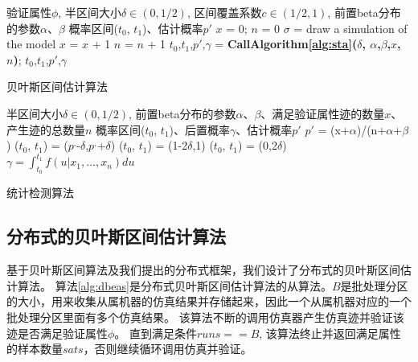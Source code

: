 \begin{algorithm}
\begin{algorithmic}[1]
\REQUIRE 验证属性$\phi$, 半区间大小$\delta \in (0, 1/2)$, 区间覆盖系数$c \in (1/2, 1)$, 前置beta分布的参数$\alpha$、$\beta$
\ENSURE 概率区间($t_0$, $t_1$)、估计概率$p'$
\STATE $x$ = 0; $n$ = 0
\LOOP
        \STATE $\sigma$ = draw a simulation of the model\;
        \IF{$\sigma\models\phi$}
        \STATE $x$ = $x$ + 1
        \ENDIF
        \STATE $n$ = $n$ + 1
        \STATE $t_0$,$t_1$,$p'$,$\gamma$ = \textbf{CallAlgorithm\ref{alg:sta}($\delta$, $\alpha$,$\beta$,$x$, $n$)};
        \RETURN $t_0$,$t_1$,$p'$,$\gamma$
        \ENDIF
\ENDLOOP
\end{algorithmic}
\caption{贝叶斯区间估计算法}
\label{alg:bie}
\end{algorithm}


\begin{algorithm}[t]
\begin{algorithmic}[1]
\REQUIRE 半区间大小$\delta \in (0, 1/2)$, 前置beta分布的参数$\alpha$、$\beta$、满足验证属性迹的数量$x$、产生迹的总数量$n$
\ENSURE 概率区间($t_0$, $t_1$)、后置概率$\gamma$、估计概率$p'$
\STATE $p'$ = (x+$\alpha$)/(n+$\alpha$+$\beta$)
\STATE ($t_0$, $t_1$) = ($p^,$-$\delta$,$p^,$+$\delta$)
        \STATE ($t_0$, $t_1$) = (1-2$\delta$,1)
        \STATE ($t_0$, $t_1$) = (0,2$\delta$)
        \ENDIF
        \STATE $\gamma=\int_{t_0}^{t_1} {f(u|x_1,...,x_n)du}$
\end{algorithmic}
\caption{统计检测算法}
\label{alg:sta}
\end{algorithm}
\subsection{分布式的贝叶斯区间估计算法}
基于贝叶斯区间算法及我们提出的分布式框架，我们设计了分布式的贝叶斯区间估计算法。 算法\ref{alg:dbeas}是分布式贝叶斯区间估计算法的从算法。$B$是批处理分区的大小，用来收集从属机器的仿真结果并存储起来，因此一个从属机器对应的一个批处理分区里面有多个仿真结果。 该算法不断的调用仿真器产生仿真迹并验证该迹是否满足验证属性$\phi$。 直到满足条件$runs == B$, 该算法终止并返回满足属性的样本数量$sats$，否则继续循环调用仿真并验证。

